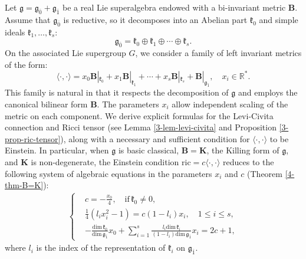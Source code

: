 \documentclass[reqno]{amsart}
\theoremstyle{definition}
\begin{document}
Let $\mathfrak{g}=\mathfrak{g}_{\bar{0}}+\mathfrak{g}_{\bar{1}}$
be  a real Lie superalgebra endowed with a bi-invariant metric $\mathbf{B}$.
Assume that $\mathfrak{g}_{\bar{0}}$ is reductive, so it decomposes into an Abelian part $\mathfrak{k}_{0}$ and simple ideals $\mathfrak{k}_{1},\ldots,\mathfrak{k}_{s}$:
\begin{equation*}
  \mathfrak{g}_{\bar{0}}=\mathfrak{k}_{0}\oplus\mathfrak{k}_{1}\oplus\cdots\oplus\mathfrak{k}_{s}.
\end{equation*}
On the associated Lie supergroup $G$, we consider a family of left invariant metrics of the form:
\begin{equation}\label{Einstein-metric-form}
\langle\cdot,\cdot\rangle
 =x_{0}\mathbf{B}|_{\mathfrak{k}_{0}}+x_{1}\mathbf{B}|_{\mathfrak{k}_{1}}+\cdots+x_{s}\mathbf{B}|_{\mathfrak{k}_{s}}
 +\mathbf{B}|_{\mathfrak{g}_{\bar{1}}}, \quad x_{i}\in \mathbb{R}^{\ast}.
\end{equation}
This family is natural in that it respects the decomposition of $\mathfrak{g}$ and employs the canonical bilinear form $\mathbf{B}$. The parameters $x_{i}$ allow independent scaling of the metric on each component.
We derive explicit formulas for the Levi-Civita connection and Ricci tensor (see Lemma \ref{3-lem-levi-civita} and Proposition \ref{3-prop-ric-tensor}),
along with a necessary and sufficient condition for $\langle\cdot,\cdot\rangle$ to be Einstein. In particular, when $\mathfrak{g}$ is basic classical, $\mathbf{B}=\mathbf{K}$, the Killing form of $\mathfrak{g}$, and $\mathbf{K}$ is non-degenerate,  the Einstein condition $\mathrm{ric}=c\langle\cdot, \cdot\rangle$ reduces to the following system of algebraic equations in the parameters $x_i$ and $c$ (Theorem \ref{4-thm-B=K}):
\begin{eqnarray*}
\left\{
\begin{aligned}
&c=-\frac{x_{0}}{4},\quad \mathrm{if}\, \mathfrak{k}_{0}\neq0, \\
&\frac{1}{4}(l_{i}x_{i}^{2}-1)=c (1-l_{i})x_{i},\quad 1\leq i\leq s,\\
&-\frac{\mathrm{dim}\,\mathfrak{k}_{0}}{\mathrm{dim}\,\mathfrak{g}_{\bar{1}}}x_{0}
+\sum\limits_{i=1}^{s}\frac{l_{i}\mathrm{dim}\,\mathfrak{k}_{i}}{(1-l_{i})\mathrm{dim}\,\mathfrak{g}_{\bar{1}}}x_{i}=2c+1,
\end{aligned}\right.
\end{eqnarray*}
where $l_{i}$ is the index of the representation of $\mathfrak{k}_{i}$
on $\mathfrak{g}_{\bar{1}}$.
\end{document}
